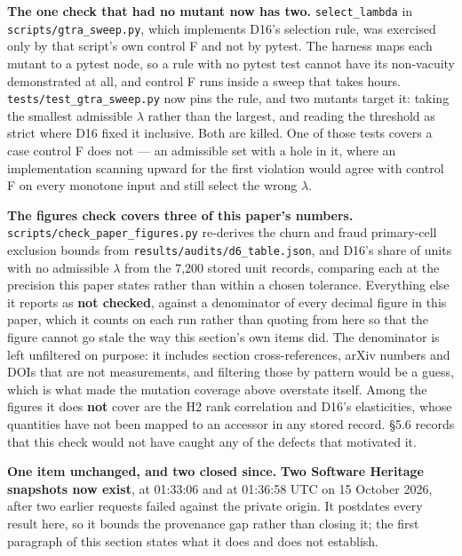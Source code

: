 \documentclass[
  10pt,
]{article}
\begin{document}
\textbf{The one check that had no mutant now has two.}
\texttt{select\_\allowbreak{}lambda} in \texttt{scripts/\allowbreak{}gtra\_\allowbreak{}sweep.py}, which
implements D16's selection rule, was exercised only by that script's own
control F and not by pytest. The harness maps each mutant to a pytest
node, so a rule with no pytest test cannot have its non-vacuity
demonstrated at all, and control F runs inside a sweep that takes hours.
\texttt{tests/\allowbreak{}test\_\allowbreak{}gtra\_\allowbreak{}sweep.py} now pins the rule, and two mutants
target it: taking the smallest admissible \(\lambda\) rather than the
largest, and reading the threshold as strict where D16 fixed it
inclusive. Both are killed. One of those tests covers a case control F
does not --- an admissible set with a hole in it, where an
implementation scanning upward for the first violation would agree with
control F on every monotone input and still select the wrong
\(\lambda\).

\textbf{The figures check covers three of this paper's numbers.}
\texttt{scripts/\allowbreak{}check\_\allowbreak{}paper\_\allowbreak{}figures.py} re-derives the churn and fraud
primary-cell exclusion bounds from
\texttt{results/\allowbreak{}audits/\allowbreak{}d6\_\allowbreak{}table.json}, and D16's share of units with no
admissible \(\lambda\) from the 7,200 stored unit records, comparing
each at the precision this paper states rather than within a chosen
tolerance. Everything else it reports as \textbf{not checked}, against a
denominator of every decimal figure in this paper, which it counts on
each run rather than quoting from here so that the figure cannot go
stale the way this section's own items did. The denominator is left
unfiltered on purpose: it includes section cross-references, arXiv
numbers and DOIs that are not measurements, and filtering those by
pattern would be a guess, which is what made the mutation coverage above
overstate itself. Among the figures it does \textbf{not} cover are the
H2 rank correlation and D16's elasticities, whose quantities have not
been mapped to an accessor in any stored record. \S{}5.6 records that
this check would not have caught any of the defects that motivated it.

\textbf{One item unchanged, and two closed since.} \textbf{Two Software
Heritage snapshots now exist},
\texttt{} at 01:33:06
and \texttt{} at
01:36:58 UTC on 15 October 2026, after two earlier requests failed
against the private origin. It postdates every result here, so it bounds
the provenance gap rather than closing it; the first paragraph of this
section states what it does and does not establish.
\end{document}
